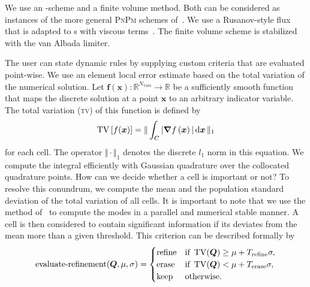 \documentclass[runningheads]{llncs}
\begin{document}
We use an \aderdg{}-scheme and a \muscl{} finite volume method.
Both can be considered as instances of the more general \textsc{PnPm} schemes of~\cite{dumbser2008unified}.
We use a Rusanov-style flux that is adapted to \pde{}s with viscous terms~\cite{gassner2008discontinuous,fambri2017space}.
The finite volume scheme is stabilized with the van Albada limiter.

The user can state dynamic \amr{} rules by supplying custom criteria that are evaluated point-wise.
We use an element local error estimate based on the total variation of the numerical solution. 
Let $\bm{f}(\bm{x}): \mathbb{R}^{N_\text{vars}} \to \mathbb{R}$ be a sufficiently smooth function that maps the discrete solution at a point $\bm{x}$ to an arbitrary indicator variable.
The total variation (\textsc{tv}) of this function is defined by
\begin{equation}
  \label{eq:tv}
  \tv \left[ f(\bm{x}) \right] =
  \Vert
\intdcell{ \vert \gradient{f \left( \bm{x} \right)} \vert }
\Vert_1
\end{equation}
for each cell.
The operator $\Vert \cdot \Vert_1$ denotes the discrete $l_1$ norm in this equation.
We compute the integral efficiently with Gaussian quadrature over the collocated quadrature points.
\newcommand{\mean}{\mu}%
\newcommand{\std}{\sigma}%
\newcommand{\variance}{\std^2}%
\newcommand{\Trefine}{T_\text{refine}}%
\newcommand{\Tdelete}{T_\text{erase}}%
How can we decide whether a cell is important or not?
To resolve this conundrum, we compute the mean and the population standard deviation of the total variation of all cells.
It is important to note that we use the method of~\cite{chan1982updating} to compute the modes in a parallel and numerical stable manner.
A cell is then considered to contain significant information if its deviates from the mean more than a given threshold.
This criterion can be described formally by
\begin{equation}
  \label{eq:refinement-criterion}
  \operatorname{evaluate-refinement}(\Q, \mu, \sigma) =
  \begin{cases}
    \text{refine} & \text{if } \tv(\Q) \geq \mu + \Trefine \sigma, \\
    \text{erase} & \text{if } \tv(\Q) < \mu + \Tdelete \sigma, \\
    \text{keep} & \text{otherwise}.
    \end{cases}
\end{equation}
\end{document}
